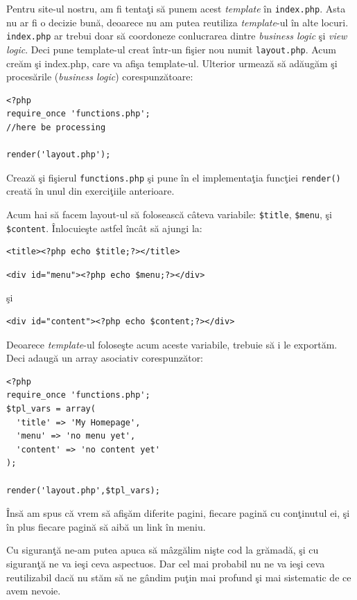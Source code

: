 Pentru site-ul nostru,
am fi tentaţi să punem acest \textit{template} în \texttt{index.php}.
Asta nu ar fi o decizie bună, deoarece nu am putea reutiliza \textit{template}-ul
în alte locuri. \texttt{index.php} ar trebui doar să coordoneze
conlucrarea dintre \textit{business logic} şi \textit{view logic}.
Deci pune template-ul creat într-un fişier nou numit \texttt{layout.php}.
Acum creăm şi index.php, care va afişa template-ul. Ulterior urmează să adăugăm
şi procesările (\textit{business logic}) corespunzătoare:
\begin{lstlisting}[title=index.php]
<?php
require_once 'functions.php';
//here be processing

render('layout.php');
\end{lstlisting}
Crează şi fişierul \texttt{functions.php} şi pune
în el implementaţia funcţiei \texttt{render()} creată
în unul din exerciţiile anterioare.

Acum hai să facem layout-ul să folosească câteva variabile:
\texttt{\$title}, \texttt{\$menu}, şi \texttt{\$content}.
Înlocuieşte astfel încât să ajungi la:
\begin{lstlisting}[numbers=none]
<title><?php echo $title;?></title>
\end{lstlisting}
\begin{lstlisting}[numbers=none]
<div id="menu"><?php echo $menu;?></div>
\end{lstlisting}
şi
\begin{lstlisting}[numbers=none]
<div id="content"><?php echo $content;?></div>
\end{lstlisting}

Deoarece \textit{template}-ul foloseşte acum aceste
variabile, trebuie să i le exportăm. Deci adaugă
un array asociativ corespunzător:
\begin{lstlisting}[title=index.php]
<?php
require_once 'functions.php';
$tpl_vars = array(
  'title' => 'My Homepage',
  'menu' => 'no menu yet',
  'content' => 'no content yet'
);

render('layout.php',$tpl_vars);
\end{lstlisting}

Însă am spus că vrem să afişăm diferite pagini, fiecare pagină cu conţinutul ei, şi
în plus fiecare pagină să aibă un link în meniu.

Cu siguranţă ne-am putea apuca să mâzgălim nişte cod la grămadă, şi cu siguranţă
ne va ieşi ceva aspectuos. Dar cel mai probabil nu ne va ieşi ceva reutilizabil
dacă nu stăm să ne gândim puţin mai profund şi mai sistematic de ce avem nevoie.

